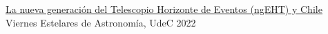 
\begin{cvhonors}
    \cvhonor
	{\href{https://www.instagram.com/reel/CkjqD5xJFyi/}{La nueva generación del Telescopio Horizonte de Eventos (ngEHT) y Chile}}
	{}
	{Viernes Estelares de Astronomía, UdeC}
	{2022}
 
\end{cvhonors}
